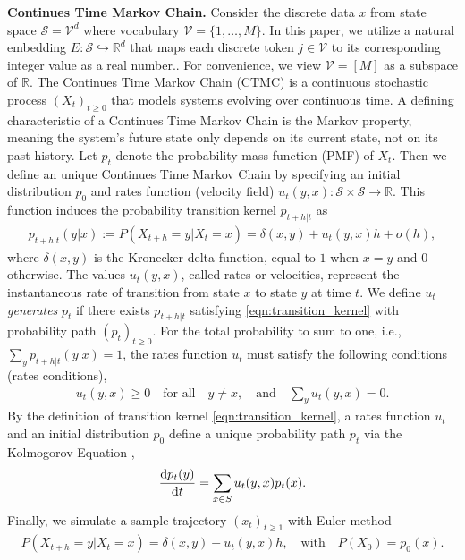 \documentclass[12pt]{article}
\numberwithin{equation}{section}
\def\R{\mathbb{R}}
\let\cite\citep
\theoremstyle{theoremstyle}
\numberwithin{equation}{section}
\numberwithin{theorem}{section}
\numberwithin{proposition}{section}
\numberwithin{definition}{section}
\numberwithin{lemma}{section}
\numberwithin{assumption}{section}
\numberwithin{remark}{section}
\begin{document}
\textbf{Continues Time Markov Chain.}
Consider the discrete data $x$ from state space $\mathcal{S} = \mathcal{V}^d$ where vocabulary $ \mathcal{V} = \{1, \ldots, M\}$.
In this paper, we utilize a natural embedding $E :\mathcal{S}\hookrightarrow\R^d$ that maps each discrete token $j \in \mathcal{V}$ to its corresponding integer value as a real number..
For convenience, we view $\mathcal{V}=[M]$ as a subspace of $\R$.
The Continues Time Markov Chain (CTMC)  \cite{norris1998markov} is a continuous stochastic process $(X_t)_{t \geq 0}$ that models systems evolving over continuous time.
A defining characteristic of a Continues Time Markov Chain is the Markov property, meaning the system's future state only depends on its current state, not on its past history. 
Let $p_t$ denote the probability mass function (PMF) of $X_t$.
Then we define an unique Continues Time Markov Chain by specifying an initial distribution $p_0$
and rates function (velocity field) $u_t(y,x): \mathcal{S} \times\mathcal{S}\to \R $. 
This function induces the probability transition kernel 
$p_{t+h|t}$ as 
\begin{align}
\label{eqn:transition_kernel}
    p_{t+h|t}(y|x) := P(X_{t+h}=y|X_t=x)
    = \delta(x,y) + u_t(y,x) h + o(h),
\end{align}
where $\delta(x,y)$ is the Kronecker delta function, equal to $1$ when $x=y$ and $0$ otherwise.
The values $u_t(y,x)$, called rates or velocities, represent the instantaneous rate of transition from state $x$ to state $y$ at time $t$.
We define $u_t$ \textit{generates} $p_t$ if there exists $p_{t+h|t}$ satisfying \eqref{eqn:transition_kernel} with probability path $(p_t)_{t \geq 0}$.
For the total probability to sum to one, i.e., $\sum_y p_{t+h|t}(y|x) = 1$, the rates function $u_t$ must satisfy the following conditions (rates conditions),
\begin{align}
\label{eqn:rates_condition}
    u_t(y,x) \geq 0 \quad\text{for all}\quad y \neq x, \quad\text{and}\quad \sum_y u_t(y,x)= 0.
\end{align}
By the definition of transition kernel \eqref{eqn:transition_kernel}, a rates function $u_t$ and an initial distribution $p_0$ define a unique probability path $p_t$ via the Kolmogorov Equation \cite[Theorem 12]{lipman2024flow}, 
\begin{align}
\label{eq:kolmogorov}
    \dv{p_t(y)}{t} = \sum_{x \in S} u_t(y,x) p_t(x).
\end{align}
Finally, we simulate a sample trajectory $(x_t)_{t \geq 1}$ with Euler method
\begin{align*}
    P(X_{t+h}=y|X_t=x)
    = \delta(x,y) + u_t(y,x) h, \quad\text{with}\quad P(X_0)=p_0(x).
\end{align*}
\end{document}
